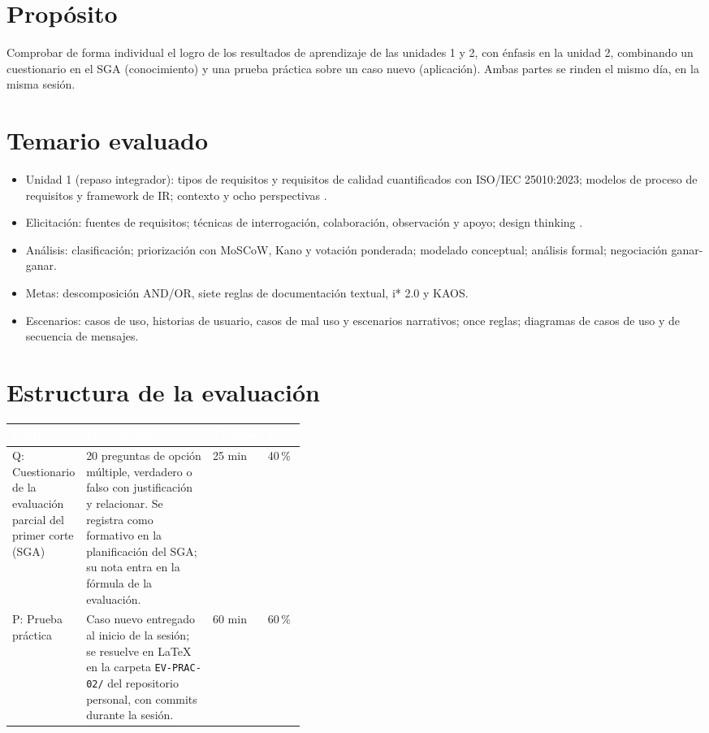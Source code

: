 \documentclass[11pt]{article}
\newcommand{\thdr}[1]{\cellcolor{utegreen}\textcolor{white}{\textbf{#1}}}
\newcommand{\seccion}[1]{\section{\textcolor{utegreendk}{#1}}}
\begin{document}
\seccion{Propósito}

Comprobar de forma individual el logro de los resultados de aprendizaje de las unidades 1 y 2, con énfasis en la unidad 2, combinando un cuestionario en el SGA (conocimiento) y una prueba práctica sobre un caso nuevo (aplicación). Ambas partes se rinden el mismo día, en la misma sesión.

\seccion{Temario evaluado}

\begin{itemize}[leftmargin=20pt,itemsep=2pt]
	\item Unidad 1 (repaso integrador): tipos de requisitos y requisitos de calidad cuantificados con ISO/\allowbreak{}IEC 25010:2023; modelos de proceso de requisitos y framework de IR; contexto y ocho perspectivas \citep{iso25010_2023,pohl_2025}.
	\item Elicitación: fuentes de requisitos; técnicas de interrogación, colaboración, observación y apoyo; design thinking \citep{pohl_2025,ireb_cpre_fl_2026}.
	\item Análisis: clasificación; priorización con MoSCoW, Kano y votación ponderada; modelado conceptual; análisis formal; negociación ganar-ganar.
	\item Metas: descomposición AND/OR, siete reglas de documentación textual, i* 2.0 y KAOS.
	\item Escenarios: casos de uso, historias de usuario, casos de mal uso y escenarios narrativos; once reglas; diagramas de casos de uso y de secuencia de mensajes.
\end{itemize}

\seccion{Estructura de la evaluación}

\noindent\begin{tabularx}{\linewidth}{|L{0.20\linewidth}|Y|C{0.12\linewidth}|C{0.10\linewidth}|}
	\hline
	\thdr{Parte} & \thdr{Descripción} & \thdr{Tiempo} & \thdr{Peso}\\
	\hline
	Q: Cuestionario de la evaluación parcial del primer corte (SGA) & 20 preguntas de opción múltiple, verdadero o falso con justificación y relacionar. Se registra como formativo en la planificación del SGA; su nota entra en la fórmula de la evaluación. & 25 min & 40\,\%\\
	\hline
	 P: Prueba práctica & Caso nuevo entregado al inicio de la sesión; se resuelve en \LaTeX{} en la carpeta \texttt{EV-PRAC-02/} del repositorio personal, con commits durante la sesión. & 60 min & 60\,\%\\
	\hline
\end{tabularx}
\end{document}
